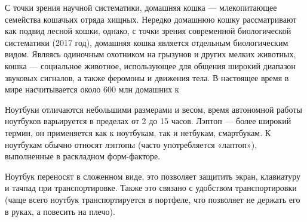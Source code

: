 \begin{frame}
	С точки зрения научной систематики, домашняя кошка — млекопитающее семейства кошачьих отряда хищных. Нередко домашнюю кошку рассматривают как подвид лесной кошки, однако, с точки зрения современной биологической систематики (2017 год), домашняя кошка является отдельным биологическим видом. Являясь одиночным охотником на грызунов и других мелких животных, кошка — социальное животное, использующее для общения широкий диапазон звуковых сигналов, а также феромоны и движения тела. В настоящее время в мире насчитывается около 600 млн домашних к
\end{frame}

\begin{frame}
	Ноутбуки отличаются небольшими размерами и весом, время автономной работы ноутбуков варьируется в пределах от 2 до 15 часов. Лэптоп — более широкий термин, он применяется как к ноутбукам, так и нетбукам, смартбукам. К ноутбукам обычно относят лэптопы (часто употребляется «лаптоп»), выполненные в раскладном форм-факторе.
\end{frame}

\begin{frame}
	Ноутбук переносят в сложенном виде, это позволяет защитить экран, клавиатуру и тачпад при транспортировке. Также это связано с удобством транспортировки (чаще всего ноутбук транспортируется в портфеле, что позволяет не держать его в руках, а повесить на плечо).
\end{frame}

